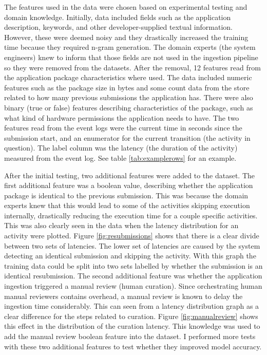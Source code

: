 The features used in the data were chosen based on experimental testing and domain knowledge.
Initially, data included fields such as the application description, keywords, and other developer-supplied textual information. 
However, these were deemed noisy and they drastically increased the training time because they required n-gram generation.
The domain experts (the system engineers) knew to inform that those fields are not used in the ingestion pipeline so they were removed from the datasets.
After the removal, 12 features read from the application package characteristics where used. 
The data included numeric features such as the package size in bytes and some count data from the store related to how many previous submissions the application has.
There were also binary (true or false) features describing characteristics of the package, such as what kind of hardware permissions the application needs to have.
The two features read from the event logs were the current time in seconds since the submission start, and an enumerator for the current transition (the activity in question).
The label column was the latency (the duration of the activity) measured from the event log.
See table \ref{tab:examplerows} for an example.

After the initial testing, two additional features were added to the dataset.
The first additional feature was a boolean value, describing whether the application package is identical to the previous submission.
This was because the domain experts knew that this would lead to some of the activities skipping execution internally, drastically reducing the execution time for a couple specific activities. 
This was also clearly seen in the data when the latency distribution for an activity were plotted. 
Figure \ref{fig:resubmissions} shows that there is a clear divide between two sets of latencies.
The lower set of latencies are caused by the system detecting an identical submission and skipping the activity.
With this graph the training data could be split into two sets labelled by whether the submission is an identical resubmission.
The second additional feature was whether the application ingestion triggered a manual review (human curation). 
Since orchestrating human manual reviewers contains overhead, a manual review is known to delay the ingestion time considerably.
This can seen from a latency distribution graph as a clear difference for the steps related to curation. 
Figure \ref{fig:manualreview} shows this effect in the distribution of the curation latency.
This knowledge was used to add the manual review boolean feature into the dataset.
I performed more tests with these two additional features to test whether they improved model accuracy.

